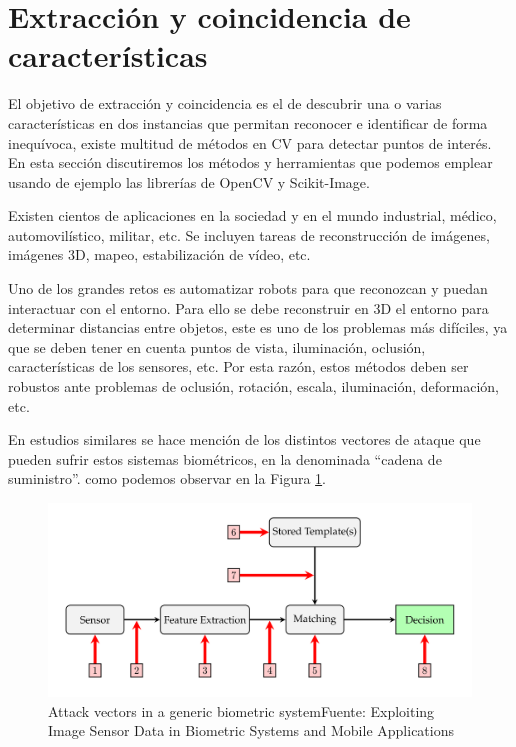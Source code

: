 \section{Extracción y coincidencia de características}

El objetivo de extracción y coincidencia es el de descubrir una o varias características en dos instancias que permitan reconocer e identificar de forma inequívoca, existe multitud de métodos en \acrfull{CV} para detectar puntos de interés. En esta sección discutiremos los métodos y herramientas que podemos emplear usando de ejemplo las librerías de OpenCV y Scikit-Image.

Existen cientos de aplicaciones en la sociedad y en el mundo industrial, médico, automovilístico, militar, etc. Se incluyen tareas de reconstrucción de imágenes, imágenes 3D, mapeo, estabilización de vídeo, etc. 

Uno de los grandes retos es automatizar robots para que reconozcan y puedan interactuar con el entorno. Para ello se debe reconstruir en 3D el entorno para determinar distancias entre objetos, este es uno de los problemas más difíciles, ya que se deben tener en cuenta puntos de vista, iluminación, oclusión, características de los sensores, etc. Por esta razón, estos métodos deben ser robustos ante problemas de oclusión, rotación, escala, iluminación, deformación, etc. \cite{A-survey-of-feature-matching-methods}

En estudios similares se hace mención de los distintos vectores de ataque que pueden sufrir estos sistemas biométricos, en la denominada ``cadena de suministro''. \cite{Debiasi20b} como podemos observar en la Figura \ref{fig:attack-vectors}.

\begin{figure}[H]
    \centering
    \includegraphics[width=0.8\linewidth]{figures/chapter04/Attack vectors in a generic biometric system.png}
    \caption{Attack vectors in a generic biometric system\newline{}Fuente: Exploiting Image Sensor Data in Biometric Systems and Mobile Applications \cite{Debiasi20b}}
    \label{fig:attack-vectors}
\end{figure}

